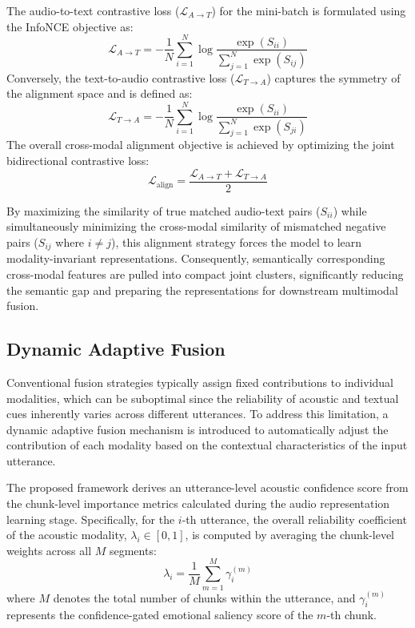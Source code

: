 The audio-to-text contrastive loss ($\mathcal{L}_{A \rightarrow T}$) for the mini-batch is formulated using the InfoNCE objective as:
\begin{equation}
	\mathcal{L}_{A \rightarrow T} = -\frac{1}{N} \sum_{i=1}^{N} \log \frac{\exp(S_{ii})}{\sum_{j=1}^{N} \exp(S_{ij})}
\end{equation}
Conversely, the text-to-audio contrastive loss ($\mathcal{L}_{T \rightarrow A}$) captures the symmetry of the alignment space and is defined as:
\begin{equation}
	\mathcal{L}_{T \rightarrow A} = -\frac{1}{N} \sum_{i=1}^{N} \log \frac{\exp(S_{ii})}{\sum_{j=1}^{N} \exp(S_{ji})}
\end{equation}
The overall cross-modal alignment objective is achieved by optimizing the joint bidirectional contrastive loss:
\begin{equation}
	\mathcal{L}_{\text{align}} = \frac{\mathcal{L}_{A \rightarrow T} + \mathcal{L}_{T \rightarrow A}}{2}
\end{equation}

By maximizing the similarity of true matched audio-text pairs ($S_{ii}$) while simultaneously minimizing the cross-modal similarity of mismatched negative pairs ($S_{ij}$ where $i \neq j$), this alignment strategy forces the model to learn modality-invariant representations. Consequently, semantically corresponding cross-modal features are pulled into compact joint clusters, significantly reducing the semantic gap and preparing the representations for downstream multimodal fusion.

\subsection{Dynamic Adaptive Fusion}
Conventional fusion strategies typically assign fixed contributions to individual modalities, which can be suboptimal since the reliability of acoustic and textual cues inherently varies across different utterances. To address this limitation, a dynamic adaptive fusion mechanism is introduced to automatically adjust the contribution of each modality based on the contextual characteristics of the input utterance.

The proposed framework derives an utterance-level acoustic confidence score from the chunk-level importance metrics calculated during the audio representation learning stage. Specifically, for the $i$-th utterance, the overall reliability coefficient of the acoustic modality, $\lambda_i \in [0,1]$, is computed by averaging the chunk-level weights across all $M$ segments:
\begin{equation}
	\lambda_i = \frac{1}{M} \sum_{m=1}^{M} \gamma_i^{(m)}
\end{equation}
where $M$ denotes the total number of chunks within the utterance, and $\gamma_i^{(m)}$ represents the confidence-gated emotional saliency score of the $m$-th chunk. 

